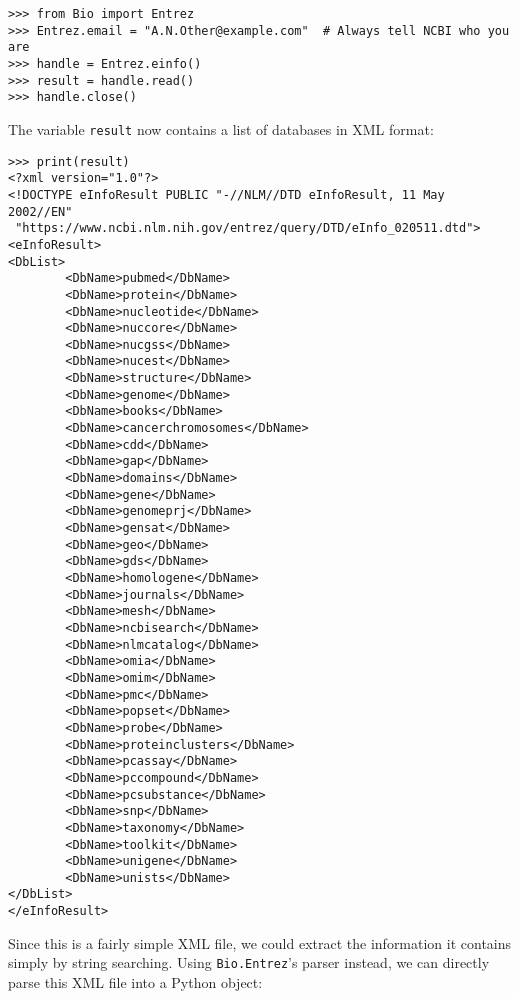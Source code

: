 \begin{verbatim}
>>> from Bio import Entrez
>>> Entrez.email = "A.N.Other@example.com"  # Always tell NCBI who you are
>>> handle = Entrez.einfo()
>>> result = handle.read()
>>> handle.close()
\end{verbatim}
The variable \verb+result+ now contains a list of databases in XML format:
\begin{verbatim}
>>> print(result)
<?xml version="1.0"?>
<!DOCTYPE eInfoResult PUBLIC "-//NLM//DTD eInfoResult, 11 May 2002//EN"
 "https://www.ncbi.nlm.nih.gov/entrez/query/DTD/eInfo_020511.dtd">
<eInfoResult>
<DbList>
        <DbName>pubmed</DbName>
        <DbName>protein</DbName>
        <DbName>nucleotide</DbName>
        <DbName>nuccore</DbName>
        <DbName>nucgss</DbName>
        <DbName>nucest</DbName>
        <DbName>structure</DbName>
        <DbName>genome</DbName>
        <DbName>books</DbName>
        <DbName>cancerchromosomes</DbName>
        <DbName>cdd</DbName>
        <DbName>gap</DbName>
        <DbName>domains</DbName>
        <DbName>gene</DbName>
        <DbName>genomeprj</DbName>
        <DbName>gensat</DbName>
        <DbName>geo</DbName>
        <DbName>gds</DbName>
        <DbName>homologene</DbName>
        <DbName>journals</DbName>
        <DbName>mesh</DbName>
        <DbName>ncbisearch</DbName>
        <DbName>nlmcatalog</DbName>
        <DbName>omia</DbName>
        <DbName>omim</DbName>
        <DbName>pmc</DbName>
        <DbName>popset</DbName>
        <DbName>probe</DbName>
        <DbName>proteinclusters</DbName>
        <DbName>pcassay</DbName>
        <DbName>pccompound</DbName>
        <DbName>pcsubstance</DbName>
        <DbName>snp</DbName>
        <DbName>taxonomy</DbName>
        <DbName>toolkit</DbName>
        <DbName>unigene</DbName>
        <DbName>unists</DbName>
</DbList>
</eInfoResult>
\end{verbatim}

Since this is a fairly simple XML file, we could extract the information it contains simply by string searching. Using \verb+Bio.Entrez+'s parser instead, we can directly parse this XML file into a Python object:

